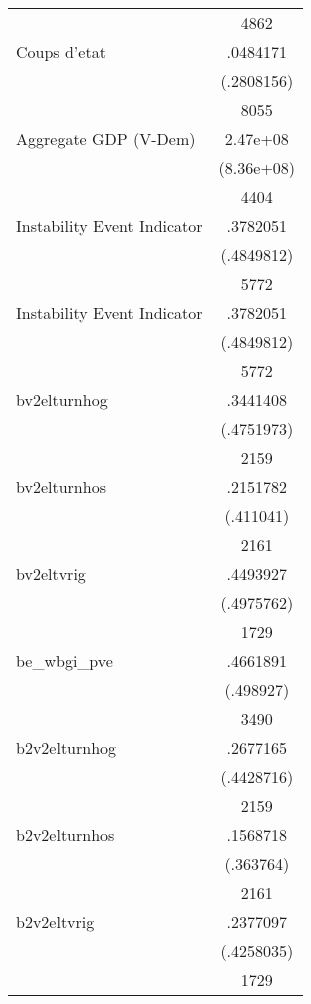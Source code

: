 {\begin{longtable}{l*{1}{c}}
                    &        4862\\
Coups d'etat        &    .0484171\\
                    &  (.2808156)\\
                    &        8055\\
Aggregate GDP (V-Dem)&    2.47e+08\\
                    &  (8.36e+08)\\
                    &        4404\\
Instability Event Indicator&    .3782051\\
                    &  (.4849812)\\
                    &        5772\\
Instability Event Indicator&    .3782051\\
                    &  (.4849812)\\
                    &        5772\\
bv2elturnhog        &    .3441408\\
                    &  (.4751973)\\
                    &        2159\\
bv2elturnhos        &    .2151782\\
                    &   (.411041)\\
                    &        2161\\
bv2eltvrig          &    .4493927\\
                    &  (.4975762)\\
                    &        1729\\
be\_wbgi\_pve         &    .4661891\\
                    &   (.498927)\\
                    &        3490\\
b2v2elturnhog       &    .2677165\\
                    &  (.4428716)\\
                    &        2159\\
b2v2elturnhos       &    .1568718\\
                    &   (.363764)\\
                    &        2161\\
b2v2eltvrig         &    .2377097\\
                    &  (.4258035)\\
                    &        1729\\

\end{longtable}}
